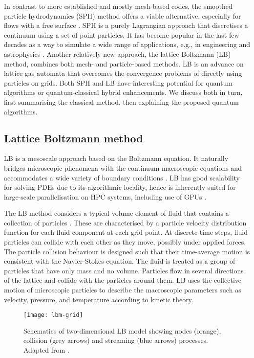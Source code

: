 \documentclass[10pt]{iopart}
\begin{document}
In contrast to more established and mostly mesh-based codes, the smoothed particle hydrodynamics (SPH) method offers a viable alternative, especially for flows with a free surface \cite{Monaghan2005}. SPH is a purely Lagrangian approach that discretises a continuum using a set of point particles. It has become popular in the last few decades as a way to simulate a wide range of applications, e.g., in engineering \cite{Monaghan2012} and astrophysics \cite{Lucy1977,Springel2010}. Another relatively new approach, the lattice-Boltzmann (LB) method, combines both mesh- and particle-based methods.  LB is an advance on lattice gas automata that overcomes the convergence problems of directly using particles on grids.
Both SPH and LB have interesting potential for quantum algorithms or quantum-classical hybrid enhancements.  We discuss both in turn, first summarising the classical method, then explaining the proposed quantum algorithms.

\subsection{Lattice Boltzmann method }\label{ssec:LB}

LB is a mesoscale approach based on the Boltzmann equation. It naturally bridges microscopic phenomena with the continuum macroscopic equations and accommodates a wide variety of boundary conditions \cite{Kruger2017,Succi2001}. LB has good scalability for solving PDEs due to its algorithmic locality, hence is inherently suited for large-scale parallelisation on HPC systems, including use of GPUs \cite{Feichtinger2015,Liu2017l,Tran2015}.

The LB method considers a typical volume element of fluid that contains a collection of particles \cite{Chen1998}. These are characterised by a particle velocity distribution function for each fluid component at each grid point. At discrete time steps, fluid particles can collide with each other as they move, possibly under applied forces. The particle collision behaviour is designed such that their time-average motion is consistent with the Navier-Stokes equation. The fluid is treated as a group of particles that have only mass and no volume. Particles flow in several directions of the lattice and collide with the particles around them. LB uses the collective motion of microscopic particles to describe the macroscopic parameters such as velocity, pressure, and temperature according to kinetic theory.

\begin{figure}[ht!]
\centering
\texttt{[image: lbm-grid]}
\caption{Schematics of two-dimensional LB model showing nodes (orange), collision (grey arrows) and streaming (blue arrows) processes. Adapted from \cite{Li2005}.}
\label{fig:lbm-grid}
\end{figure}
\end{document}
